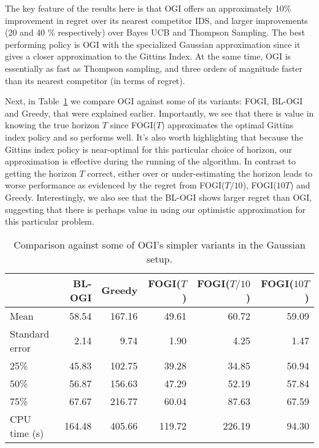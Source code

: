 The key feature of the results here is that OGI offers an approximately 10\% improvement in regret over its nearest competitor IDS, and larger improvements (20 and 40 \% respectively) over Bayes UCB and Thompson Sampling. The best performing policy is OGI with the specialized Gaussian approximation since it gives a closer approximation to the Gittins Index. At the same time, OGI is essentially as fast as Thompson sampling, and three orders of magnitude faster than its nearest competitor (in terms of regret). 

{\color{blue}
Next, in Table~\ref{table:gaussian_experiment2} we compare OGI against some of its variants: FOGI, BL-OGI and Greedy, that were explained earlier. Importantly, we see that there is value in knowing the true horizon $T$ since FOGI($T$) approximates the optimal Gittins index policy and so performs well. It's also worth highlighting that because the Gittins index policy is near-optimal for this particular choice of horizon, our approximation is effective during the running of the algorithm.
In contrast to getting the horizon $T$ correct, either over or under-estimating the horizon leads to worse performance as evidenced by the regret from FOGI($T/10$), FOGI($10T$) and Greedy. Interestingly, we also see that the BL-OGI shows larger regret than OGI, suggesting that there is perhaps value in using our optimistic approximation for this particular problem.
}

\begin{table}[h!]
	\centering
	{\color{blue}
	\begin{tabular}{lrrrrr}
		\toprule
		{} &  \textbf{BL-OGI} &  \textbf{Greedy} &  \textbf{FOGI($T$)} &  \textbf{FOGI($T/10$)} &  \textbf{FOGI($10T$)} \\
		\midrule
		Mean  &   58.54 &  167.16 &      49.61 &         60.72 &        59.09 \\
		Standard error   &    2.14 &    9.74 &       1.90 &          4.25 &         1.47 \\
		25\%   &   45.83 &  102.75 &      39.28 &         34.85 &        50.94 \\
		50\%   &   56.87 &  156.63 &      47.29 &         52.19 &        57.84 \\
		75\%   &   67.67 &  216.77 &      60.04 &         87.63 &        67.59 \\
		CPU time (s)   &  164.48 &  405.66 &     119.72 &        226.19 &        94.30 \\
		\bottomrule
	\end{tabular}
	}
	\caption[Table caption text]{Comparison against some of OGI's simpler variants in the  Gaussian setup.}
	\label{table:gaussian_experiment2}
\end{table}

